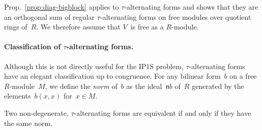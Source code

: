 \documentclass{lms}
\let\fr\mathfrak
\begin{document}
Prop.~\ref{prop:diag-bigblock} applies to $τ$-alternating forms and shows
that they are an orthogonal sum of regular $τ$-alternating forms on free
modules over quotient rings of~$R$. We therefore assume that $V$~is free
as a $R$-module.

\paragraph{Classification of $τ$-alternating forms.}
Although this is not directly useful for the IP1S problem,
$τ$-alternating forms have an elegant classification up to congruence.
For any bilinear form~$b$ on a free $R$-module~$M$, we define the
\emph{norm} of~$b$ as the ideal~$\fr{n} b$ of~$R$
generated by the elements~$b(x, x)$ for~$x ∈ M$.

\begin{prop}\label{prop:eqv-norm}
Two non-degenerate, $τ$-alternating forms are equivalent if and only
if they have the same norm.
\end{prop}
\end{document}
